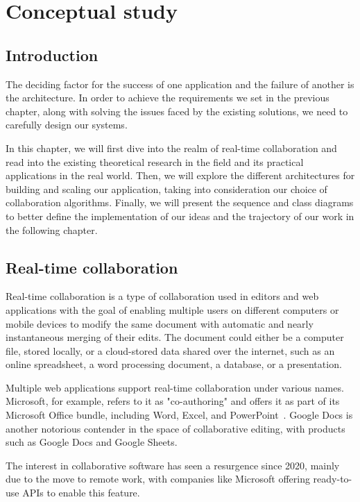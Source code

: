 \chapter{Conceptual study}
\label{chap:conceptual}

\section{Introduction}

The deciding factor for the success of one application and the failure of another is the architecture.
In order to achieve the requirements we set in the previous chapter, along with solving the issues faced by the existing solutions, we need to carefully design our systems.

In this chapter, we will first dive into the realm of real-time collaboration and read into the existing theoretical research in the field and its practical applications in the real world.
Then, we will explore the different architectures for building and scaling our application, taking into consideration our choice of collaboration algorithms.
Finally, we will present the sequence and class diagrams to better define the implementation of our ideas and the trajectory of our work in the following chapter.

\section{Real-time collaboration}

Real-time collaboration is a type of collaboration used in editors and web applications with the goal of enabling multiple users on different computers or mobile devices to modify the same document with automatic and nearly instantaneous merging of their edits.
The document could either be a computer file, stored locally, or a cloud-stored data shared over the internet, such as an online spreadsheet, a word processing document, a database, or a presentation.

Multiple web applications support real-time collaboration under various names.
Microsoft, for example, refers to it as "co-authoring" and offers it as part of its Microsoft Office bundle, including Word, Excel, and PowerPoint~\autocite{noauthor_document_nodate}.
Google Docs is another notorious contender in the space of collaborative editing, with products such as Google Docs and Google Sheets.

The interest in collaborative software has seen a resurgence since 2020, mainly due to the move to remote work, with companies like Microsoft offering ready-to-use APIs to enable this feature.

